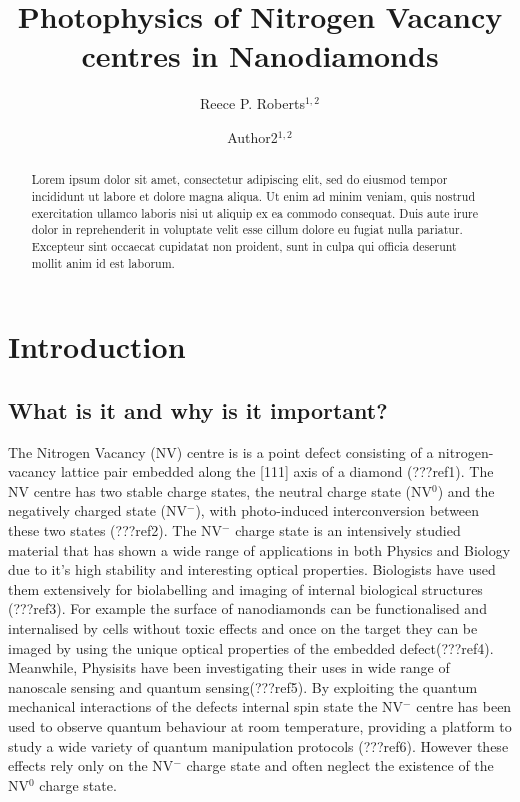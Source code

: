 \documentclass[preprint,prl]{revtex4}
\begin{document}
\title{Photophysics of Nitrogen Vacancy centres in Nanodiamonds}
  
\author{Reece P. Roberts$^{1,2}$}
\author{Author2$^{1,2}$}



\begin{abstract}
Lorem ipsum dolor sit amet, consectetur adipiscing elit, sed do eiusmod tempor incididunt ut labore et dolore magna aliqua. Ut enim ad minim veniam, quis nostrud exercitation ullamco laboris nisi ut aliquip ex ea commodo consequat. Duis aute irure dolor in reprehenderit in voluptate velit esse cillum dolore eu fugiat nulla pariatur. Excepteur sint occaecat cupidatat non proident, sunt in culpa qui officia deserunt mollit anim id est laborum.
\end{abstract}

\maketitle

\section{Introduction}
\subsection{What is it and why is it important?}
The Nitrogen Vacancy (NV) centre is is a point defect consisting of a nitrogen-vacancy lattice pair embedded along the [111] axis of a diamond (???ref1). The NV centre has two stable charge states, the neutral charge state (NV$^0$) and the negatively charged state (NV$^-$), with photo-induced interconversion between these two states (???ref2). The NV$^-$ charge state is an intensively studied material that has shown a wide range of applications in both Physics and Biology due to it's high stability and interesting optical properties. Biologists have used them extensively for biolabelling and imaging of internal biological structures (???ref3). For example the surface of nanodiamonds can be functionalised and internalised by cells without toxic effects and once on the target they can be imaged by using the unique optical properties of the embedded defect(???ref4). Meanwhile, Physisits have been investigating their uses in wide range of nanoscale sensing and quantum sensing(???ref5). By exploiting the quantum mechanical interactions of the defects internal spin state the NV$^-$ centre has been used to observe quantum behaviour at room temperature, providing a platform to study a wide variety of quantum manipulation protocols (???ref6). However these effects rely only on the NV$^-$ charge state and often neglect the  existence of the NV$^0$ charge state. 
\end{document}
